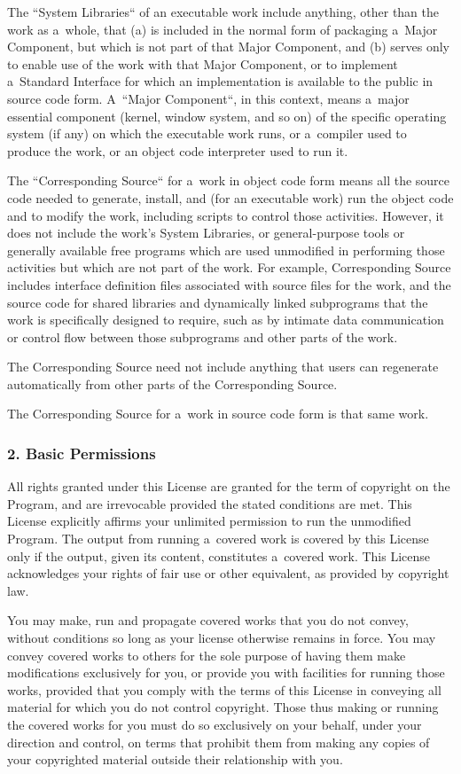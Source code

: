 \documentclass[a4paper, 11pt, twoside]{article}
\begin{document}
The “System Libraries“ of an executable work include anything, other than the work as a~whole, that (a) is included in the normal form of packaging a~Major Component, but which is not part of that Major Component, and (b) serves only to enable use of the work with that Major Component, or to implement a~Standard Interface for which an implementation is available to the public in source code form. A~“Major Component“, in this context, means a~major essential component (kernel, window system, and so on) of the specific operating system (if any) on which the executable work runs, or a~compiler used to produce the work, or an object code interpreter used to run it.

The “Corresponding Source“ for a~work in object code form means all the source code needed to generate, install, and (for an executable work) run the object code and to modify the work, including scripts to control those activities. However, it does not include the work's System Libraries, or general-purpose tools or generally available free programs which are used unmodified in performing those activities but which are not part of the work. For example, Corresponding Source includes interface definition files associated with source files for the work, and the source code for shared libraries and dynamically linked subprograms that the work is specifically designed to require, such as by intimate data communication or control flow between those subprograms and other parts of the work.

The Corresponding Source need not include anything that users can regenerate automatically from other parts of the Corresponding Source.

The Corresponding Source for a~work in source code form is that same work.

\subsubsection{2. Basic Permissions}

All rights granted under this License are granted for the term of copyright on the Program, and are irrevocable provided the stated conditions are met. This License explicitly affirms your unlimited permission to run the unmodified Program. The output from running a~covered work is covered by this License only if the output, given its content, constitutes a~covered work. This License acknowledges your rights of fair use or other equivalent, as provided by copyright law.

You may make, run and propagate covered works that you do not convey, without conditions so long as your license otherwise remains in force. You may convey covered works to others for the sole purpose of having them make modifications exclusively for you, or provide you with facilities for running those works, provided that you comply with the terms of this License in conveying all material for which you do not control copyright. Those thus making or running the covered works for you must do so exclusively on your behalf, under your direction and control, on terms that prohibit them from making any copies of your copyrighted material outside their relationship with you.
\end{document}
